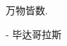 \documentclass[main.tex]{subfiles}
\begin{document}
\begin{flushright}
	\begin{kaishu}
		万物皆数.\\
	\end{kaishu}
	- 毕达哥拉斯
\end{flushright}
\end{document}
